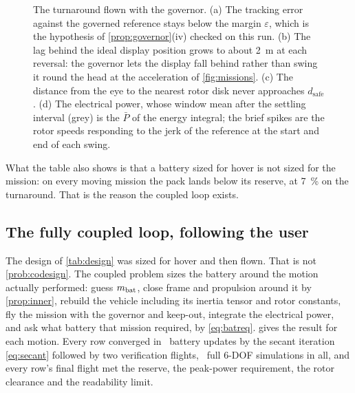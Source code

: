 \begin{figure}[htbp]
\centering

\caption{The turnaround flown with the governor. (a) The tracking error
against the governed reference stays below the margin $\varepsilon$, which is
the hypothesis of \cref{prop:governor}(iv) checked on this run. (b) The lag
behind the ideal display position grows to about \SI{2}{\metre} at each
reversal: the governor lets the display fall behind rather than swing it round
the head at the acceleration of \cref{fig:missions}. (c) The distance from the
eye to the nearest rotor disk never approaches $d_{\mathrm{safe}}$. (d) The
electrical power, whose window mean after the settling interval (grey) is the
$\bar P$ of the energy integral; the brief spikes are the rotor speeds
responding to the jerk of the reference at the start and end of each swing.}
\label{fig:turn}
\end{figure}

What the table also shows is that a battery sized for hover is not sized for
the mission: on every moving mission the pack lands below its reserve, at
\SI{7}{\percent} on the turnaround. That is the reason the coupled loop exists.

\FloatBarrier
\subsection{The fully coupled loop, following the user}

The design of \cref{tab:design} was sized for hover and then flown. That is
not \cref{prob:codesign}. The coupled problem sizes the battery around the
motion actually performed: guess $m_{\mathrm{bat}}$, close frame and propulsion around it
by \cref{prop:inner}, rebuild the vehicle including its inertia tensor and
rotor constants, fly the mission with the governor and keep-out, integrate the
electrical power, and ask what battery that mission required, by
\cref{eq:batreq}.  gives the result for each motion. Every
row converged in \rCoupItLo\ battery updates by the secant iteration
\cref{eq:secant} followed by two verification flights, \rCoupSimLo\ full
6-DOF simulations in all, and every row's final flight met the reserve, the
peak-power requirement, the rotor clearance and the readability limit.

